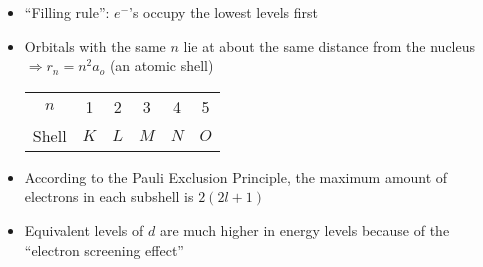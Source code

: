 \begin{itemize}
\begin{itemize}
      \item ``Filling rule'': $e^-$'s occupy the lowest levels first

      \item Orbitals with the same $n$ lie at about the same distance from the nucleus $\Longrightarrow r_n=n^2a_o$ (an atomic shell)

        \begin{center}
          \begin{tabular}[h!]{c c c c c c}
            $n$ & 1 & 2 & 3 & 4 & 5 \\
            Shell & $K$ & $L$ & $M$ & $N$ & $O$\\
          \end{tabular}
        \end{center}

      \item According to the Pauli Exclusion Principle, the maximum amount of electrons in each subshell is $2(2l+1)$

      \item Equivalent levels of $d$ are much higher in energy levels because of the ``electron screening effect''

    \end{itemize}

\end{itemize}



